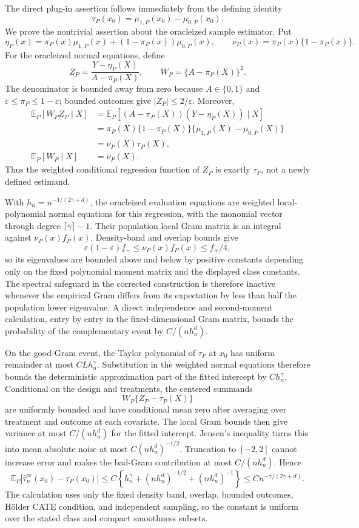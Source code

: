 The direct plug-in assertion follows immediately from the defining identity
\[
\tau_P(x_0)=\mu_{1,P}(x_0)-\mu_{0,P}(x_0).
\]
We prove the nontrivial assertion about the oracleized sample estimator.  Put
\[
\eta_P(x)=\pi_P(x)\mu_{1,P}(x)+(1-\pi_P(x))\mu_{0,P}(x),\qquad
\nu_P(x)=\pi_P(x)\{1-\pi_P(x)\}.
\]
For the oracleized normal equations, define
\[
Z_P=\frac{Y-\eta_P(X)}{A-\pi_P(X)},\qquad
W_P=\{A-\pi_P(X)\}^2.
\]
The denominator is bounded away from zero because \(A\in\{0,1\}\) and
\(\varepsilon\leq\pi_P\leq1-\varepsilon\); bounded outcomes give
\(|Z_P|\leq2/\varepsilon\).  Moreover,
\[
\begin{aligned}
\mathbb E_P[W_PZ_P\mid X]
&=\mathbb E_P[(A-\pi_P(X))(Y-\eta_P(X))\mid X]\\
&=\pi_P(X)\{1-\pi_P(X)\}\{\mu_{1,P}(X)-\mu_{0,P}(X)\}\\
&=\nu_P(X)\tau_P(X),\\
\mathbb E_P[W_P\mid X]&=\nu_P(X).
\end{aligned}
\]
Thus the weighted conditional regression function of \(Z_P\) is exactly
\(\tau_P\), not a newly defined estimand.

With \(h_n=n^{-1/(2\gamma+d)}\), the oracleized evaluation equations are
weighted local-polynomial normal equations for this regression, with the
monomial vector through degree \(\lceil\gamma\rceil-1\).  Their population
local Gram matrix is an integral against
\(\nu_P(x)f_P(x)\).  Density-band and overlap bounds give
\[
\varepsilon(1-\varepsilon)f_-\leq
\nu_P(x)f_P(x)\leq f_+/4,
\]
so its eigenvalues are bounded above and below by positive constants depending
only on the fixed polynomial moment matrix and the displayed class constants.
The spectral safeguard in the corrected construction is therefore inactive
whenever the empirical Gram differs from its expectation by less than half
the population lower eigenvalue.  A direct independence and second-moment
calculation, entry by entry in the fixed-dimensional Gram matrix, bounds the
probability of the complementary event by \(C/(nh_n^d)\).

On the good-Gram event, the Taylor polynomial of \(\tau_P\) at \(x_0\) has
uniform remainder at most \(CLh_n^\gamma\).  Substitution in the weighted
normal equations therefore bounds the deterministic approximation part of
the fitted intercept by \(Ch_n^\gamma\).  Conditional on the design and
treatments, the centered summands
\[
W_P\{Z_P-\tau_P(X)\}
\]
are uniformly bounded and have conditional mean zero after averaging over
treatment and outcome at each covariate.  The local Gram bounds then give
variance at most \(C/(nh_n^d)\) for the fitted intercept.  Jensen's inequality
turns this into mean absolute noise at most \(C(nh_n^d)^{-1/2}\).  Truncation
to \([-2,2]\) cannot increase error and makes the bad-Gram contribution at
most \(C/(nh_n^d)\).  Hence
\[
\mathbb E_P|\widehat\tau_n^{\mathrm{or}}(x_0)-\tau_P(x_0)|
\leq C\left\{h_n^\gamma+(nh_n^d)^{-1/2}+(nh_n^d)^{-1}\right\}
\leq Cn^{-\gamma/(2\gamma+d)}.
\]
The calculation uses only the fixed density band, overlap, bounded outcomes,
H\"older CATE condition, and independent sampling, so the constant is uniform
over the stated class and compact smoothness subsets.